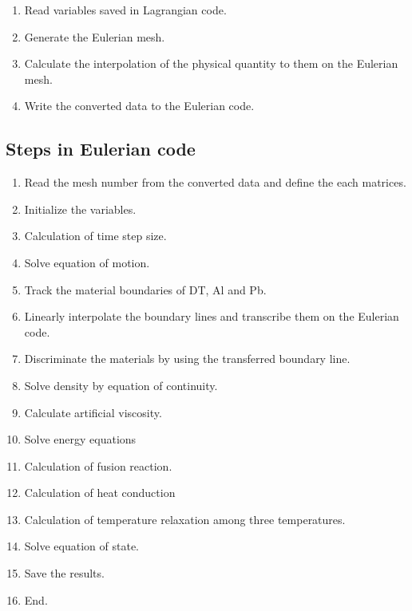 \begin {enumerate}
\item Read variables saved in Lagrangian code.\par
\item Generate the Eulerian mesh.\par
\item Calculate the interpolation of the physical quantity to them on the Eulerian mesh.\par
\item Write the converted data to the Eulerian code.\par
\end {enumerate}


\subsection{Steps in Eulerian code}

\begin {enumerate}
\item Read the mesh number from the converted data and define the each matrices.\par
\item Initialize the variables.\par
\item Calculation of time step size.\par
\item Solve equation of motion. \par
\item Track the material boundaries of DT, Al and Pb.\par
\item Linearly interpolate the boundary lines and transcribe them on the Eulerian code. \par
\item Discriminate the materials by using the transferred boundary line. \par
\item Solve density by equation of continuity.\par
\item Calculate artificial viscosity.\par
\item Solve energy equations\par
\item Calculation of fusion reaction.\par
\item Calculation of heat conduction\par
\item Calculation of temperature relaxation among three temperatures.\par
\item Solve equation of state.\par
\item Save the results.\par
\item End.
\end{enumerate}

%